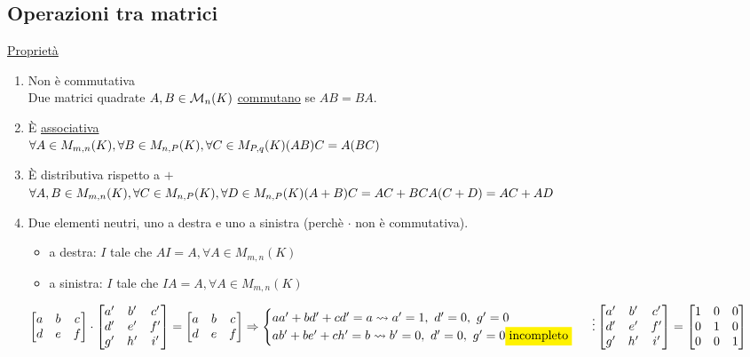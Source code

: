 \documentclass{article}
\begin{document}
\subsection*{Operazioni tra matrici}
\ul{Proprietà}
\begin{enumerate}
	\item Non è commutativa\\
	      Due matrici quadrate $A,B\in \mathcal{M}_n(K)$ \ul{commutano} se $AB=BA$.
	\item È \ul{associativa}\\
	      $\forall A\in M_{m,n}(K),\forall B\in M_{n,P}(K),\forall C\in M_{P,q}(K)\\(AB)C=A(BC)$
	\item È distributiva rispetto a $+$\\
	      $\forall A,B\in M_{m,n}(K), \forall C\in M_{n,P}(K),\forall D\in M_{n,P}(K)\\(A+B)C=AC+BC\\A(C+D)=AC+AD$
	\item Due elementi neutri, uno a destra e uno a sinistra (perchè $\cdot$ non è commutativa).
	      \begin{itemize}
		      \item a destra: $I$ tale che $AI=A, \forall A\in M_{m,n}(K)$
		      \item a sinistra: $I$ tale che $IA=A, \forall A\in M_{m,n}(K)$
	      \end{itemize}
	      $\begin{bmatrix}
			      a & b & c \\
			      d & e & f \\
		      \end{bmatrix}\cdot
		      \begin{bmatrix}
			      a' & b' & c' \\
			      d' & e' & f' \\
			      g' & h' & i' \\
		      \end{bmatrix}=
		      \begin{bmatrix}
			      a & b & c \\
			      d & e & f \\
		      \end{bmatrix}\Rightarrow
		      \begin{cases}
			      aa'+bd'+cd'=a\rightsquigarrow a'=1,\ d'=0,\ g'=0 \\
			      ab'+be'+ch'=b\rightsquigarrow b'=0,\ d'=0,\ g'=0 \text{\hl{incompleto}}\
		      \end{cases}\\\vdots\\\\
		      \begin{bmatrix}
			      a' & b' & c' \\
			      d' & e' & f' \\
			      g' & h' & i' \\
		      \end{bmatrix}=
		      \begin{bmatrix}1&0&0\\0&1&0\\0&0&1\end{bmatrix}$
\end{enumerate}
\end{document}
